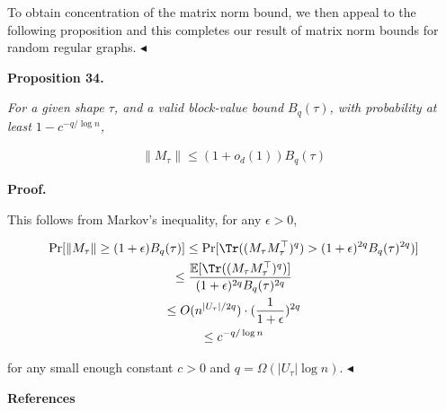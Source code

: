 \documentclass[10pt,a4paper]{article}
\begin{document}
To obtain concentration of the matrix norm bound, we then appeal to the following proposition and this completes our result of matrix norm bounds for random regular graphs.
$\blacktriangleleft$\par





\par\medskip\noindent\textbf{
\textbf{Proposition 34}\textbf{.}
}\par



\emph{For a given shape $\tau$, and a valid block-value bound $B_{q}(\tau)$, with probability at least $1-c^{-q/\log n}$,}\par


\[\begin{gathered}
\|M_{\tau}\|\leq(1+o_{d}(1))B_{q}(\tau)
\end{gathered}\]







\par\medskip\noindent\textbf{Proof.}\par




This follows from Markov’s inequality, for any $\epsilon>0$,\par


\[\begin{gathered}
\displaystyle\Pr[\|M_{\tau}\|\geq(1+\epsilon)B_{q}(\tau)] \displaystyle\leq\Pr[\Tr((M_{\tau}M_{\tau}^{\top})^{q})>(1+\epsilon)^{2q}B_{q}(\tau)^{2q})] \\
\displaystyle\leq\frac{\mathbb{E}[\Tr((M_{\tau}M_{\tau}^{\top})^{q})]}{(1+\epsilon)^{2q}B_{q}(\tau)^{2q}} \\
\displaystyle\leq O(n^{|U_{\tau}|/2q})\cdot(\frac{1}{1+\epsilon})^{2q} \\
\displaystyle\leq c^{-q/\log n}
\end{gathered}\]


for any small enough constant $c>0$ and $q=\Omega(|U_{\tau}|\log n)$.
$\blacktriangleleft$\par







\par\medskip\noindent\textbf{References}\par
\end{document}
